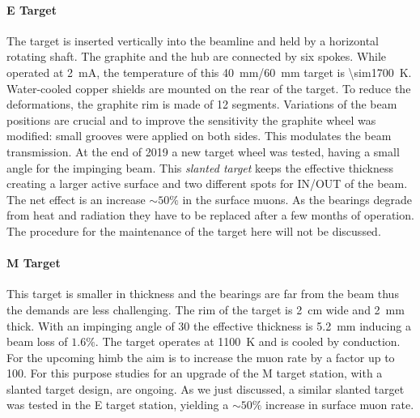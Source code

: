 \begin{refsection}
        \paragraph{E Target}
        The target is inserted vertically into the beamline and held by a horizontal rotating shaft. The graphite and the hub are connected by six spokes. 
        While operated at \SI{2}{mA}, the temperature of this \SI{40}{mm}/\SI{60}{mm} target is \SI{\sim1700}{K}. 
        Water-cooled copper shields are mounted on the rear of the target. 
        To reduce the deformations, the graphite rim is made of 12 segments. 
        Variations of the beam positions are crucial and to improve the sensitivity the graphite wheel was modified: small grooves were applied on both sides. 
        This modulates the beam transmission.
        At the end of 2019 a new target wheel was tested, having a small angle for the impinging beam. 
        This \textit{slanted target} keeps the effective thickness creating a larger active surface and two different spots for IN/OUT of the beam. 
        The net effect is an increase $\sim50\%$ in the surface muons.
        As the bearings degrade from heat and radiation they have to be replaced after a few months of operation. 
        The procedure for the maintenance of the target here will not be discussed.
        
        \paragraph{M Target}
        This target is smaller in thickness and the bearings are far from the beam thus the demands are less challenging. 
        The rim of the target is \SI{2}{cm} wide and \SI{2}{mm} thick.  
        With an impinging angle of \SI{30}{\deg} the effective thickness is \SI{5.2}{mm} inducing a beam loss of $1.6\%$. 
        The target operates at \SI{1100}{K} and is cooled by conduction.
        For the upcoming \gls{himb} the aim is to increase the muon rate by a factor up to 100. 
        For this purpose studies for an upgrade of the M target station, with a slanted target design, are ongoing.
        As we just discussed, a similar slanted target was tested in the E target station, yielding a $\sim 50\%$ increase in surface muon rate.
        

\end{refsection}
